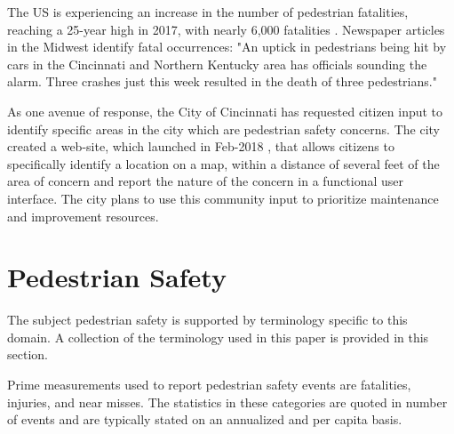\documentclass{llncs}
\begin{document}
The US is experiencing an increase in the number of pedestrian fatalities, reaching a 25-year high in 2017, with nearly 6,000 fatalities \cite{domonoske2018pedestrian}. Newspaper articles in the Midwest identify fatal occurrences: \cite{kelley2018police} "An uptick in pedestrians being hit by cars in the Cincinnati and Northern Kentucky area has officials sounding the alarm. Three crashes just this week resulted in the death of three pedestrians."

As one avenue of response, the City of Cincinnati has requested citizen input to identify specific areas in the city which are pedestrian safety concerns. The city created a web-site, which launched in Feb-2018 \cite{cvg2018city}, that allows citizens to specifically identify a location on a map, within a distance of several feet of the area of concern and report the nature of the concern in a functional user interface. The city plans to use this community input to prioritize maintenance and improvement resources.

\section{Pedestrian Safety}
%
The subject pedestrian safety is supported by terminology specific to this domain. A collection of the terminology used in this paper is provided in this section. 

Prime measurements used to report pedestrian safety events are fatalities, injuries, and near misses. The statistics in these categories are quoted in number of events and are typically stated on an annualized and per capita basis.
\end{document}
